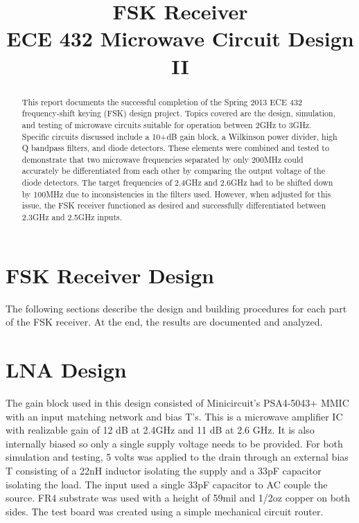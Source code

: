 \documentclass[conference]{IEEEtran}
\begin{document}
\title{FSK Receiver\\ECE 432 Microwave Circuit Design II}
\author{
\and
{}
}
\maketitle
\IEEEpeerreviewmaketitle
\begin{abstract}
This report documents the successful completion of the Spring 2013 ECE 432 frequency-shift keying (FSK) design project. Topics covered are the design, simulation, and testing of microwave circuits suitable for operation between 2GHz to 3GHz. Specific circuits discussed include a 10+dB gain block, a Wilkinson power divider, high Q bandpass filters, and diode detectors. These elements were combined and tested to demonstrate that two microwave frequencies separated by only 200MHz could accurately be differentiated from each other by comparing the output voltage of the diode detectors. The target frequencies of 2.4GHz and 2.6GHz had to be shifted down by 100MHz due to inconsistencies in the filters used. However, when adjusted for this issue, the FSK receiver functioned as desired and successfully differentiated between 2.3GHz and 2.5GHz inputs.
\end{abstract}
\section{FSK Receiver Design}
The following sections describe the design and building procedures for each part of the FSK receiver. At the end, the results are documented and analyzed.


\section{LNA Design}
The gain block used in this design consisted of Minicircuit's PSA4-5043+ MMIC with an input matching network and bias T's. This is a microwave amplifier IC with realizable gain of 12 dB at 2.4GHz and 11 dB at 2.6 GHz. It is also internally biased so only a single supply voltage needs to be provided. For both simulation and testing, 5 volts was applied to the drain through an external bias T consisting of a 22nH inductor isolating the supply and a 33pF capacitor isolating the load. The input used a single 33pF capacitor to AC couple the source. FR4 substrate was used with a height of 59mil and 1/2oz copper on both sides. The test board was created using a simple mechanical circuit router. 
\end{document}
